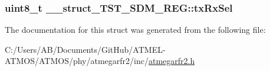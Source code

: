 \hypertarget{struct____struct___t_s_t___s_d_m___r_e_g_afc9879f4cc5319a0b63d1536be751e57}{
\subsubsection[{tx\-Rx\-Sel}]{\setlength{\rightskip}{0pt plus 5cm}uint8\-\_\-t \-\_\-\-\_\-struct\-\_\-\-T\-S\-T\-\_\-\-S\-D\-M\-\_\-\-R\-E\-G\-::tx\-Rx\-Sel}}\label{struct____struct___t_s_t___s_d_m___r_e_g_afc9879f4cc5319a0b63d1536be751e57}


The documentation for this struct was generated from the following file\-:\begin{DoxyCompactItemize}
\item 
C\-:/\-Users/\-A\-B/\-Documents/\-Git\-Hub/\-A\-T\-M\-E\-L-\/\-A\-T\-M\-O\-S/\-A\-T\-M\-O\-S/phy/atmegarfr2/inc/\hyperlink{atmegarfr2_8h}{atmegarfr2.\-h}\end{DoxyCompactItemize}
